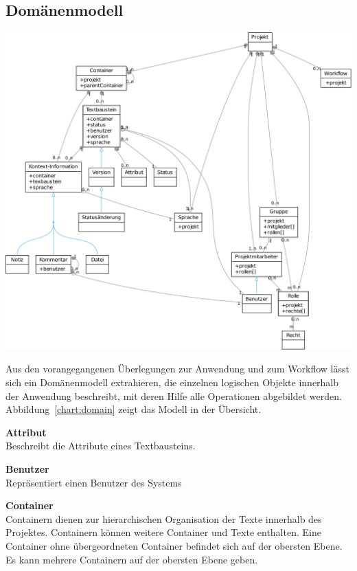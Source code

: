 \subsection{Domänenmodell}\label{l:domänenmodell}

\begin{center}
\includegraphics[width=\textwidth]{media/domain.pdf}
\label{chart:domain}
\end{center}

Aus den vorangegangenen Überlegungen zur Anwendung und zum Workflow lässt sich ein Domänenmodell extrahieren, die einzelnen logischen Objekte innerhalb der Anwendung beschreibt, mit deren Hilfe alle Operationen abgebildet werden. Abbildung~\ref{chart:domain} zeigt das Modell in der Übersicht.


\textsf{\textbf{Attribut}}\\Beschreibt die Attribute eines Textbausteins.

\textsf{\textbf{Benutzer}}\\Repräsentiert einen Benutzer des Systems

\textsf{\textbf{Container}}\\Containern dienen zur hierarchischen Organisation der Texte innerhalb des Projektes. Containern können weitere Container und Texte enthalten. Eine Container ohne übergeordneten Container befindet sich auf der obersten Ebene. Es kann mehrere Containern auf der obersten Ebene geben.

